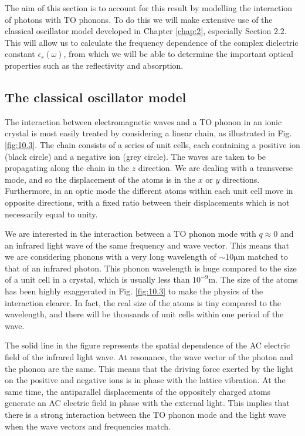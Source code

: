 \documentclass[12pt]{book}
\begin{document}
{The aim of this section is to account for this result by modelling the interaction of photons with TO phonons. To do this we will make extensive use of the classical oscillator model developed in Chapter \ref{chap:2}, especially Section 2.2. This will allow us to calculate the frequency dependence of the complex dielectric constant $\epsilon_r(\omega)$, from which we will be able to determine the important optical properties such as the reflectivity and absorption.

\subsection{The classical oscillator model}

The interaction between electromagnetic waves and a TO phonon in an ionic crystal is most easily treated by considering a linear chain, as illustrated in Fig. \ref{fig:10.3}. The chain consists of a series of unit cells, each containing a positive ion (black circle) and a negative ion (grey circle). The waves are taken to be propagating along the chain in the $z$ direction. We are dealing with a transverse mode, and so the displacement of the atoms is in the $x$ or $y$ directions. Furthermore, in an optic mode the different atoms within each unit cell move  in opposite directions, with a fixed ratio between their displacements which is not necessarily equal to unity.

We are interested in the interaction between a TO phonon mode with $q\approx0$ and an infrared light wave of the same frequency and wave vector. This means that we are considering phonons with a very long wavelength of $\sim\mathrm{10\mu m}$ matched to that of an infrared photon. This phonon wavelength is huge compared to the size of a unit cell in a crystal, which is usually less than $\mathrm{10^{-9}m}$. The size of the atoms has been highly exaggerated in Fig. \ref{fig:10.3} to make the physics of the interaction clearer. In fact, the real size of the atoms is tiny compared to the wavelength, and there will be thousands of unit cells within one period of the wave.

The solid line in the figure represents the spatial dependence of the AC electric field of the infrared light wave. At resonance, the wave vector of the photon and the phonon are the same. This means that the driving force exerted by the light on the positive and negative ions is in phase with the lattice vibration. At the same time, the antiparallel displacements of the oppositely charged atoms generate an AC electric field in phase with the external light. This implies that there is a strong interaction between the TO phonon mode and the light wave when the wave vectors and frequencies match.

}
\end{document}
